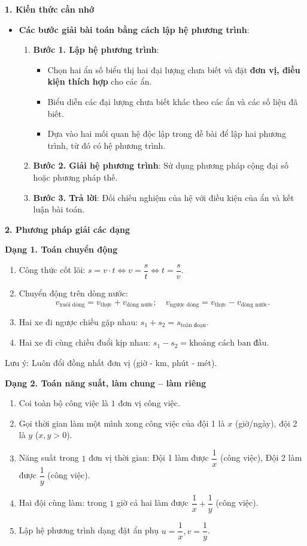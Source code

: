 \textbf{1. Kiến thức cần nhớ}
\begin{itemize}
\item \textbf{Các bước giải bài toán bằng cách lập hệ phương trình}:
\begin{enumerate}
\item \textbf{Bước 1. Lập hệ phương trình}:
\begin{itemize}
\item Chọn hai ẩn số biểu thị hai đại lượng chưa biết và đặt \textbf{đơn vị, điều kiện thích hợp} cho các ẩn.
\item Biểu diễn các đại lượng chưa biết khác theo các ẩn và các số liệu đã biết.
\item Dựa vào hai mối quan hệ độc lập trong đề bài để lập hai phương trình, từ đó có hệ phương trình.
\end{itemize}
\item \textbf{Bước 2. Giải hệ phương trình}: Sử dụng phương pháp cộng đại số hoặc phương pháp thế.
\item \textbf{Bước 3. Trả lời}: Đối chiếu nghiệm của hệ với điều kiện của ẩn và kết luận bài toán.
\end{enumerate}
\end{itemize}

\textbf{2. Phương pháp giải các dạng}

\textbf{Dạng 1. Toán chuyển động}
\begin{enumerate}
\item Công thức cốt lõi: $\boxed{s = v \cdot t} \iff v = \dfrac{s}{t} \iff t = \dfrac{s}{v}$.
\item Chuyển động trên dòng nước:
$$v_{\text{xuôi dòng}} = v_{\text{thực}} + v_{\text{dòng nước}};\quad v_{\text{ngược dòng}} = v_{\text{thực}} - v_{\text{dòng nước}}.$$
\item Hai xe đi ngược chiều gặp nhau: $s_1 + s_2 = s_{\text{toàn đoạn}}$.
\item Hai xe đi cùng chiều đuổi kịp nhau: $s_1 - s_2 = \text{khoảng cách ban đầu}$.
\end{enumerate}
Lưu ý: Luôn đổi đồng nhất đơn vị (giờ - km, phút - mét).

\textbf{Dạng 2. Toán năng suất, làm chung – làm riêng}
\begin{enumerate}
\item Coi toàn bộ công việc là $1$ đơn vị công việc.
\item Gọi thời gian làm một mình xong công việc của đội 1 là $x$ (giờ/ngày), đội 2 là $y$ ($x, y > 0$).
\item Năng suất trong $1$ đơn vị thời gian: Đội 1 làm được $\dfrac{1}{x}$ (công việc), Đội 2 làm được $\dfrac{1}{y}$ (công việc).
\item Hai đội cùng làm: trong $1$ giờ cả hai làm được $\dfrac{1}{x} + \dfrac{1}{y}$ (công việc).
\item Lập hệ phương trình dạng đặt ẩn phụ $u = \dfrac{1}{x}, v = \dfrac{1}{y}$.
\end{enumerate}

